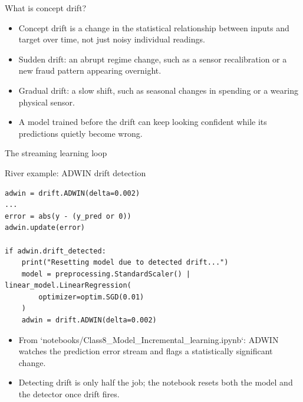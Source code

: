 \begin{frame}{What is concept drift?}
\begin{itemize}
\item Concept drift is a change in the statistical relationship between inputs and target over time, not just noisy individual readings.
\item Sudden drift: an abrupt regime change, such as a sensor recalibration or a new fraud pattern appearing overnight.
\item Gradual drift: a slow shift, such as seasonal changes in spending or a wearing physical sensor.
\item A model trained before the drift can keep looking confident while its predictions quietly become wrong.
\end{itemize}
\coursefooter
\end{frame}

\begin{frame}{The streaming learning loop}
\centering
{}
\coursefooter
\end{frame}

\begin{frame}[fragile]{River example: ADWIN drift detection}
\begin{lstlisting}[style=coursepython]
adwin = drift.ADWIN(delta=0.002)
...
error = abs(y - (y_pred or 0))
adwin.update(error)

if adwin.drift_detected:
    print("Resetting model due to detected drift...")
    model = preprocessing.StandardScaler() | linear_model.LinearRegression(
        optimizer=optim.SGD(0.01)
    )
    adwin = drift.ADWIN(delta=0.002)
\end{lstlisting}
\begin{itemize}
\item From `notebooks/Class8_Model_Incremental_learning.ipynb`: ADWIN watches the prediction error stream and flags a statistically significant change.
\item Detecting drift is only half the job; the notebook resets both the model and the detector once drift fires.
\end{itemize}
\coursefooter
\end{frame}

